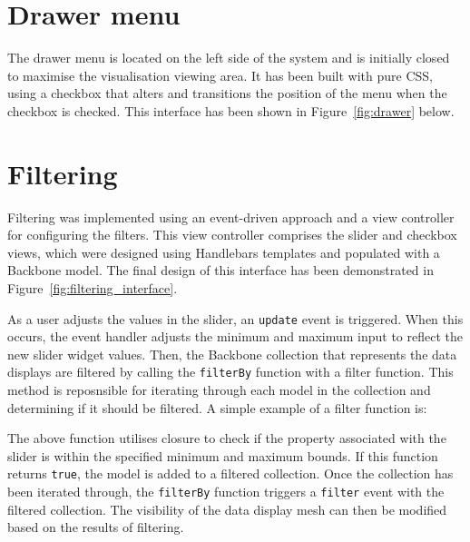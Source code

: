 \section{Drawer menu} {
\label{sec:drawer}

	The drawer menu is located on the left side of the system and is initially closed to maximise the visualisation viewing area. It has been built with pure CSS, using a checkbox that alters and transitions the position of the menu when the checkbox is checked. This interface has been shown in Figure~\ref{fig:drawer} below.

	

}

\section{Filtering} {
\label{sec:filtering_implementation}

	Filtering was implemented using an event-driven approach and a view controller for configuring the filters. This view controller comprises the slider and checkbox views, which were designed using Handlebars templates and populated with a Backbone model. The final design of this interface has been demonstrated in Figure~\ref{fig:filtering_interface}.

	

	As a user adjusts the values in the slider, an \texttt{update} event is triggered. When this occurs, the event handler adjusts the minimum and maximum input to reflect the new slider widget values. Then, the Backbone collection that represents the data displays are filtered by calling the \texttt{filterBy} function with a filter function. This method is reposnsible for iterating through each model in the collection and determining if it should be filtered. A simple example of a filter function is:

	

	The above function utilises closure to check if the property associated with the slider is within the specified minimum and maximum bounds. If this function returns \texttt{true}, the model is added to a filtered collection. Once the collection has been iterated through, the \texttt{filterBy} function triggers a \texttt{filter} event with the filtered collection. The visibility of the data display mesh can then be modified based on the results of filtering.

}
